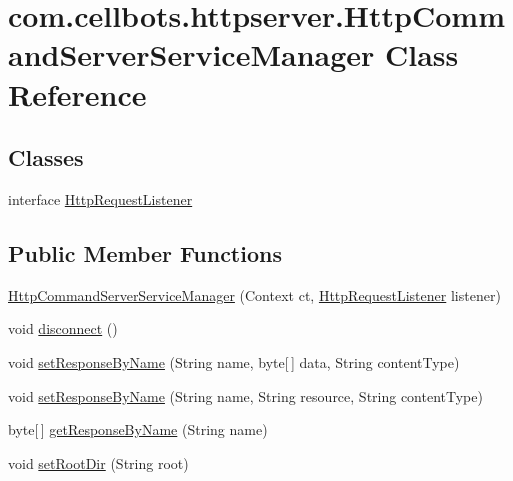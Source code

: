 \hypertarget{classcom_1_1cellbots_1_1httpserver_1_1_http_command_server_service_manager}{\section{com.\-cellbots.\-httpserver.\-Http\-Command\-Server\-Service\-Manager Class Reference}
\label{classcom_1_1cellbots_1_1httpserver_1_1_http_command_server_service_manager}
}
\subsection*{Classes}
\begin{DoxyCompactItemize}
\item 
interface \hyperlink{interfacecom_1_1cellbots_1_1httpserver_1_1_http_command_server_service_manager_1_1_http_request_listener}{Http\-Request\-Listener}
\end{DoxyCompactItemize}
\subsection*{Public Member Functions}
\begin{DoxyCompactItemize}
\item 
\hyperlink{classcom_1_1cellbots_1_1httpserver_1_1_http_command_server_service_manager_a7b99c811f6b2e448edbd1327730fdd02}{Http\-Command\-Server\-Service\-Manager} (Context ct, \hyperlink{interfacecom_1_1cellbots_1_1httpserver_1_1_http_command_server_service_manager_1_1_http_request_listener}{Http\-Request\-Listener} listener)
\item 
void \hyperlink{classcom_1_1cellbots_1_1httpserver_1_1_http_command_server_service_manager_a6cde9e9028d5b45b6e17373d81b18ad6}{disconnect} ()
\item 
void \hyperlink{classcom_1_1cellbots_1_1httpserver_1_1_http_command_server_service_manager_a57104289b515803897f27a5a854026ba}{set\-Response\-By\-Name} (String name, byte\mbox{[}$\,$\mbox{]} data, String content\-Type)
\item 
void \hyperlink{classcom_1_1cellbots_1_1httpserver_1_1_http_command_server_service_manager_a34a7dbb3149608cfad622c03af9e82a0}{set\-Response\-By\-Name} (String name, String resource, String content\-Type)
\item 
byte\mbox{[}$\,$\mbox{]} \hyperlink{classcom_1_1cellbots_1_1httpserver_1_1_http_command_server_service_manager_ad025b83c5f800fa524d37602934bb74c}{get\-Response\-By\-Name} (String name)
\item 
void \hyperlink{classcom_1_1cellbots_1_1httpserver_1_1_http_command_server_service_manager_a7c90fdbdcb2e4129d1a86f3e59174a7e}{set\-Root\-Dir} (String root)
\end{DoxyCompactItemize}

